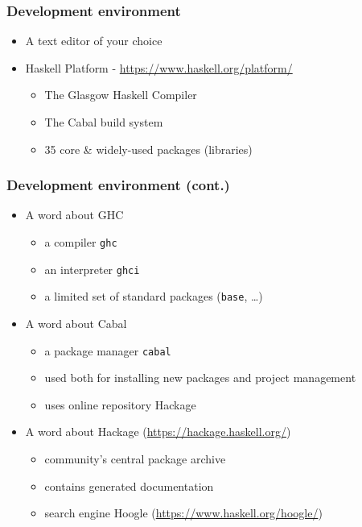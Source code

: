 \documentclass[pdftex,landscape,final,handout,british]{beamer}
\begin{document}
\begin{frame}
    \frametitle{Development environment}

    \begin{itemize}
        \item A text editor of your choice

        \item Haskell Platform - \url{https://www.haskell.org/platform/}
            \begin{itemize}
                \item The Glasgow Haskell Compiler
                \item The Cabal build system
                \item 35 core \& widely-used packages (libraries)
            \end{itemize}
    \end{itemize}

\end{frame}


\begin{frame}
    \frametitle{Development environment (cont.)}

    \begin{itemize}
        \item A word about GHC
            \begin{itemize}
                \item a compiler {\tt ghc}
                \item an interpreter {\tt ghci}
                \item a limited set of standard packages ({\tt base}, \dots)
            \end{itemize}

        \item A word about Cabal
            \begin{itemize}
                \item a package manager {\tt cabal}
                \item used both for installing new packages and project
                    management
                \item uses online repository Hackage
            \end{itemize}

        \item A word about Hackage (\url{https://hackage.haskell.org/})
            \begin{itemize}
                \item community's central package archive
                \item contains generated documentation
                \item search engine Hoogle
                    (\url{https://www.haskell.org/hoogle/})
            \end{itemize}


    \end{itemize}

\end{frame}
\end{document}
